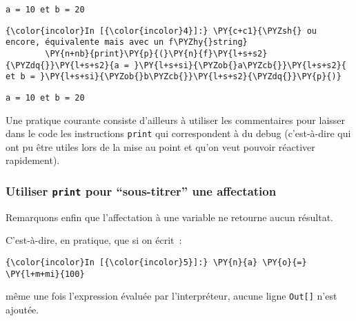     \begin{Verbatim}[commandchars=\\\{\},frame=single,framerule=0.3mm,rulecolor=\color{cellframecolor}]
a = 10 et b = 20
\end{Verbatim}

    \begin{Verbatim}[commandchars=\\\{\},frame=single,framerule=0.3mm,rulecolor=\color{cellframecolor}]
{\color{incolor}In [{\color{incolor}4}]:} \PY{c+c1}{\PYZsh{} ou encore, équivalente mais avec un f\PYZhy{}string}
        \PY{n+nb}{print}\PY{p}{(}\PY{n}{f}\PY{l+s+s2}{\PYZdq{}}\PY{l+s+s2}{a = }\PY{l+s+si}{\PYZob{}a\PYZcb{}}\PY{l+s+s2}{ et b = }\PY{l+s+si}{\PYZob{}b\PYZcb{}}\PY{l+s+s2}{\PYZdq{}}\PY{p}{)}
\end{Verbatim}


    \begin{Verbatim}[commandchars=\\\{\},frame=single,framerule=0.3mm,rulecolor=\color{cellframecolor}]
a = 10 et b = 20
\end{Verbatim}

    Une pratique courante consiste d'ailleurs à utiliser les commentaires
pour laisser dans le code les instructions \texttt{print} qui
correspondent à du debug (c'est-à-dire qui ont pu être utiles lors de la
mise au point et qu'on veut pouvoir réactiver rapidement).

    \hypertarget{utiliser-print-pour-sous-titrer-une-affectation}{%
\subsubsection{\texorpdfstring{Utiliser \texttt{print} pour
``sous-titrer'' une
affectation}{Utiliser print pour ``sous-titrer'' une affectation}}\label{utiliser-print-pour-sous-titrer-une-affectation}}

    Remarquons enfin que l'affectation à une variable ne retourne aucun
résultat.

C'est-à-dire, en pratique, que si on écrit~:

    \begin{Verbatim}[commandchars=\\\{\},frame=single,framerule=0.3mm,rulecolor=\color{cellframecolor}]
{\color{incolor}In [{\color{incolor}5}]:} \PY{n}{a} \PY{o}{=} \PY{l+m+mi}{100}
\end{Verbatim}


    même une fois l'expression évaluée par l'interpréteur, aucune ligne
\texttt{Out{[}{]}} n'est ajoutée.

